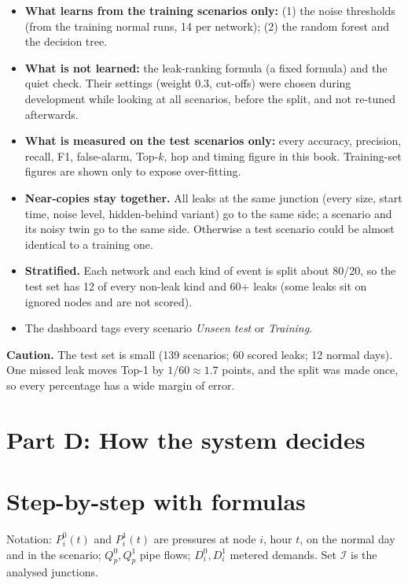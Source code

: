 \documentclass[11pt,a4paper]{article}
\begin{document}
\begin{itemize}
\item \textbf{What learns from the training scenarios only:} (1) the noise thresholds (from the training normal runs, 14 per network); (2) the random forest and the decision tree.
\item \textbf{What is not learned:} the leak-ranking formula (a fixed formula) and the quiet check. Their settings (weight 0.3, cut-offs) were chosen during development while looking at all scenarios, before the split, and not re-tuned afterwards.
\item \textbf{What is measured on the test scenarios only:} every accuracy, precision, recall, F1, false-alarm, Top-$k$, hop and timing figure in this book. Training-set figures are shown only to expose over-fitting.
\item \textbf{Near-copies stay together.} All leaks at the same junction (every size, start time, noise level, hidden-behind variant) go to the same side; a scenario and its noisy twin go to the same side. Otherwise a test scenario could be almost identical to a training one.
\item \textbf{Stratified.} Each network and each kind of event is split about 80/20, so the test set has 12 of every non-leak kind and 60+ leaks (some leaks sit on ignored nodes and are not scored).
\item The dashboard tags every scenario \emph{Unseen test} or \emph{Training}.
\end{itemize}
\begin{note}\textbf{Caution.} The test set is small (139 scenarios; 60 scored leaks; 12 normal days). One missed leak moves Top-1 by $1/60\approx1.7$ points, and the split was made once, so every percentage has a wide margin of error.\end{note}

\section*{Part D: How the system decides}
\section{Step-by-step with formulas}
Notation: $P^0_i(t)$ and $P^1_i(t)$ are pressures at node $i$, hour $t$, on the normal day and in the scenario; $Q^0_p,Q^1_p$ pipe flows; $D^0_i,D^1_i$ metered demands. Set $\mathcal I$ is the analysed junctions.
\end{document}
